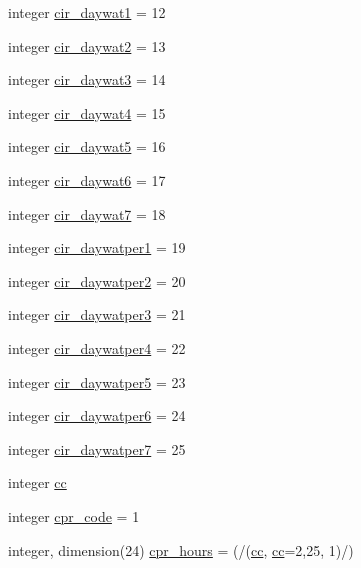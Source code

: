 \begin{DoxyCompactItemize}
integer \hyperlink{namespacecolnamesinputfiles_ae366ea7f91d46d7ae02adbaa72c69fc7}{cir\+\_\+daywat1} = 12
\item 
integer \hyperlink{namespacecolnamesinputfiles_a46ac814b1f9e3860eda8b2d3f8b98022}{cir\+\_\+daywat2} = 13
\item 
integer \hyperlink{namespacecolnamesinputfiles_a5fdc3e0318cb70a593a401c15baedb7a}{cir\+\_\+daywat3} = 14
\item 
integer \hyperlink{namespacecolnamesinputfiles_aa29df165330619d23581d35254047bc7}{cir\+\_\+daywat4} = 15
\item 
integer \hyperlink{namespacecolnamesinputfiles_a7943b96a6ee53979d0394d5eefea95ed}{cir\+\_\+daywat5} = 16
\item 
integer \hyperlink{namespacecolnamesinputfiles_a1a09101de13db7f85453c989a9a891fc}{cir\+\_\+daywat6} = 17
\item 
integer \hyperlink{namespacecolnamesinputfiles_a8f31fe6755d7d8f089c4b244fd4b3115}{cir\+\_\+daywat7} = 18
\item 
integer \hyperlink{namespacecolnamesinputfiles_a3a96967e254f5137681427f9c99465eb}{cir\+\_\+daywatper1} = 19
\item 
integer \hyperlink{namespacecolnamesinputfiles_a80dbec2d6698a9ca1109bf06273aea49}{cir\+\_\+daywatper2} = 20
\item 
integer \hyperlink{namespacecolnamesinputfiles_aa686ddadbda26b6dd5198ef4f429e2ab}{cir\+\_\+daywatper3} = 21
\item 
integer \hyperlink{namespacecolnamesinputfiles_a7cc2b6bb7cb07b32eca0c822a6ff2d17}{cir\+\_\+daywatper4} = 22
\item 
integer \hyperlink{namespacecolnamesinputfiles_ac15044187066dced13198e564a45738d}{cir\+\_\+daywatper5} = 23
\item 
integer \hyperlink{namespacecolnamesinputfiles_acb2c6c0689b539ea0304aafc097df6b2}{cir\+\_\+daywatper6} = 24
\item 
integer \hyperlink{namespacecolnamesinputfiles_a99f8b756b8f4523b745b30592b1a9090}{cir\+\_\+daywatper7} = 25
\item 
integer \hyperlink{namespacecolnamesinputfiles_aee7fac5f3ecf99c110512bc11d4cd8a4}{cc}
\item 
integer \hyperlink{namespacecolnamesinputfiles_aa372231915b61eaf06a35e9f62426c61}{cpr\+\_\+code} = 1
\item 
integer, dimension(24) \hyperlink{namespacecolnamesinputfiles_a36cac26a00244cef8f0f55f3c6769bf0}{cpr\+\_\+hours} = (/(\hyperlink{namespacecolnamesinputfiles_aee7fac5f3ecf99c110512bc11d4cd8a4}{cc}, \hyperlink{namespacecolnamesinputfiles_aee7fac5f3ecf99c110512bc11d4cd8a4}{cc}=2,25, 1)/)

\end{DoxyCompactItemize}
